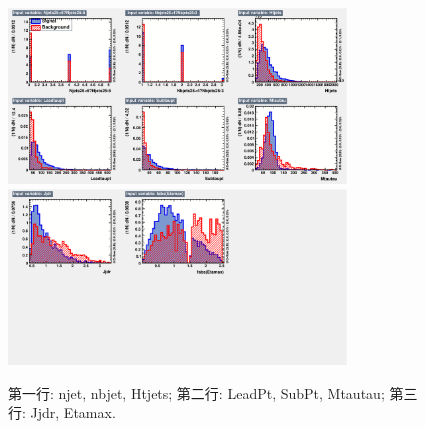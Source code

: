\begin{figure}[htbp]
\centering
\begin{center}
  \includegraphics[width=0.8\textwidth, keepaspectratio]{fig/OneLepTwoTaus/variables_id_c1.pdf}
  \includegraphics[width=0.8\textwidth, keepaspectratio]{fig/OneLepTwoTaus/variables_id_c2.pdf}
\end{center}
\caption{第一行: njet, nbjet, Htjets; 第二行: LeadPt, SubPt, Mtautau; 第三行: Jjdr, Etamax.}
\label{Fig:1l2tau.bdtinputs}
\end{figure}

